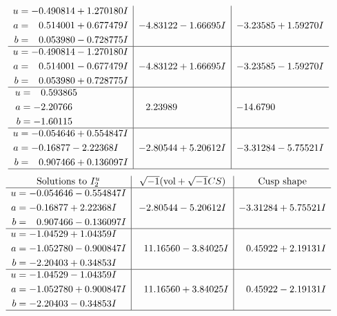 \documentclass[1p]{elsarticle_modified}
\theoremstyle{definition}
\newcommand{\I}{\sqrt{-1}}
\begin{document}
$$\begin{array}{c|c|c}
\begin{aligned}
u &= -0.490814 + 1.270180 I \\
a &= \phantom{-}0.514001 + 0.677479 I \\
b &= \phantom{-}0.053980 - 0.728775 I\end{aligned}
 & -4.83122 - 1.66695 I & -3.23585 + 1.59270 I \\ \hline\begin{aligned}
u &= -0.490814 - 1.270180 I \\
a &= \phantom{-}0.514001 - 0.677479 I \\
b &= \phantom{-}0.053980 + 0.728775 I\end{aligned}
 & -4.83122 + 1.66695 I & -3.23585 - 1.59270 I \\ \hline\begin{aligned}
u &= \phantom{-}0.593865\phantom{ +0.000000I} \\
a &= -2.20766\phantom{ +0.000000I} \\
b &= -1.60115\phantom{ +0.000000I}\end{aligned}
 & \phantom{-}2.23989\phantom{ +0.000000I} & -14.6790\phantom{ +0.000000I} \\ \hline\begin{aligned}
u &= -0.054646 + 0.554847 I \\
a &= -0.16877 - 2.22368 I \\
b &= \phantom{-}0.907466 + 0.136097 I\end{aligned}
 & -2.80544 + 5.20612 I & -3.31284 - 5.75521 I\\
 \hline 
 \end{array}$$\newpage$$\begin{array}{c|c|c}  
\text{Solutions to }I^u_{2}& \I (\text{vol} + \sqrt{-1}CS) & \text{Cusp shape}\\
 \hline 
\begin{aligned}
u &= -0.054646 - 0.554847 I \\
a &= -0.16877 + 2.22368 I \\
b &= \phantom{-}0.907466 - 0.136097 I\end{aligned}
 & -2.80544 - 5.20612 I & -3.31284 + 5.75521 I \\ \hline\begin{aligned}
u &= -1.04529 + 1.04359 I \\
a &= -1.052780 - 0.900847 I \\
b &= -2.20403 + 0.34853 I\end{aligned}
 & \phantom{-}11.16560 - 3.84025 I & \phantom{-}0.45922 + 2.19131 I \\ \hline\begin{aligned}
u &= -1.04529 - 1.04359 I \\
a &= -1.052780 + 0.900847 I \\
b &= -2.20403 - 0.34853 I\end{aligned}
 & \phantom{-}11.16560 + 3.84025 I & \phantom{-}0.45922 - 2.19131 I\\
 \hline 
 \end{array}$$\newpage\newpage\renewcommand{\arraystretch}{1}
\end{document}
